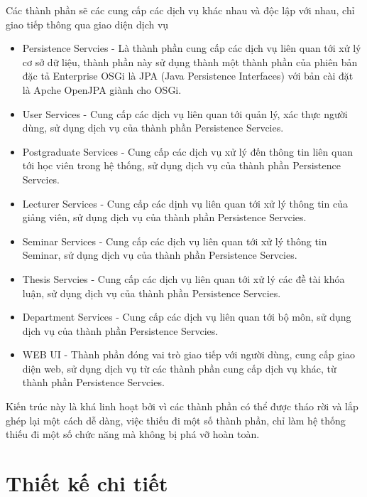 Các thành phần sẽ các cung cấp các dịch vụ khác nhau và độc lập với nhau, chỉ giao tiếp thông qua giao diện dịch vụ
\begin{itemize}
\item Persistence Servcies - Là thành phần cung cấp các dịch vụ liên quan tới xử lý cơ sở dữ liệu, thành phần này sử dụng thành một thành phần của phiên bản đặc tả Enterprise OSGi là JPA \cite{osgiee5} (Java Persistence Interfaces) với bản cài đặt là Apche OpenJPA \cite{openjpa} giành cho OSGi.
\item User Services - Cung cấp các dịch vụ liên quan tới quản lý, xác thực người dùng, sử dụng dịch vụ của thành phần Persistence Servcies.
\item Postgraduate Services - Cung cấp các dịch vụ xử lý đến thông tin liên quan tới học viên trong hệ thống, sử dụng dịch vụ của thành phần Persistence Servcies.
\item Lecturer Services - Cung cấp các dịnh vụ liên quan tới xử lý thông tin của giảng viên, sử dụng dịch vụ của thành phần Persistence Servcies.
\item Seminar Services - Cung cấp các dịch vụ liên quan tới xử lý thông tin Seminar, sử dụng dịch vụ của thành phần Persistence Servcies.
\item Thesis Servcies - Cung cấp các dịch vụ liên quan tới xử lý các đề tài khóa luận, sử dụng dịch vụ của thành phần Persistence Servcies.
\item Department Services - Cung cấp các dịch vụ liên quan tới bộ môn, sử dụng dịch vụ của thành phần Persistence Servcies.
\item WEB UI - Thành phần đóng vai trò giao tiếp với người dùng, cung cấp giao diện web, sử dụng dịch vụ từ các thành phần cung cấp dịch vụ khác, từ thành phần Persistence Servcies.
\end{itemize}

Kiến trúc này là khá linh hoạt bởi vì các thành phần có thể được tháo rời và lắp ghép lại một cách dễ dàng, việc thiếu đi một số thành phần, chỉ làm hệ thống thiếu đi một số chức năng mà không bị phá vỡ hoàn toàn.
\section{Thiết kế chi tiết}
